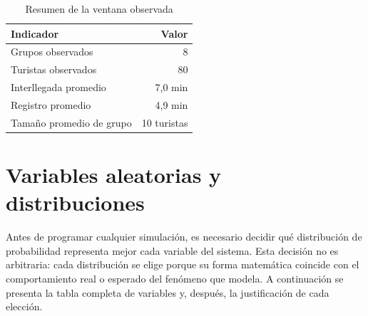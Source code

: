 \documentclass[12pt,a4paper]{article}
\begin{document}
\begin{table}[H]
  \centering
  \caption{Resumen de la ventana observada}
  \begin{tabular}{@{}lr@{}}
    \toprule
    Indicador & Valor \\
    \midrule
    Grupos observados         &  8      \\
    Turistas observados       & 80      \\
    Interllegada promedio     &  7,0 min \\
    Registro promedio         &  4,9 min \\
    Tamaño promedio de grupo  & 10 turistas \\
    \bottomrule
  \end{tabular}
\end{table}

\section{Variables aleatorias y distribuciones}

Antes de programar cualquier simulación, es necesario decidir qué
distribución de probabilidad representa mejor cada variable del sistema.
Esta decisión no es arbitraria: cada distribución se elige porque su
forma matemática coincide con el comportamiento real o esperado del
fenómeno que modela. A continuación se presenta la tabla completa de
variables y, después, la justificación de cada elección.
\end{document}
